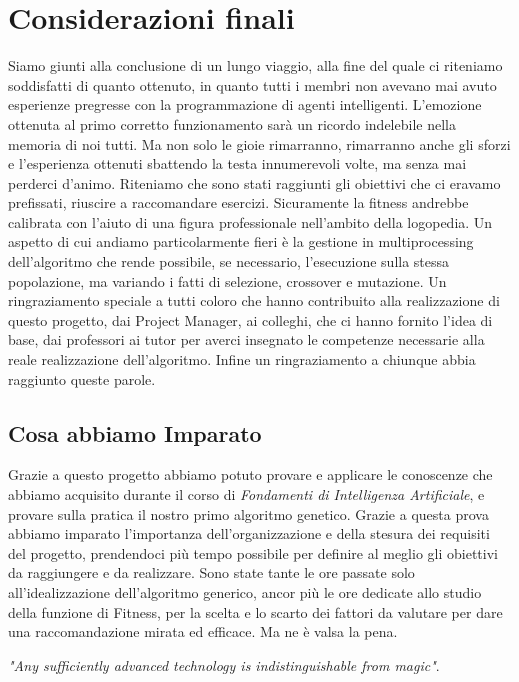 \documentclass{article}
\begin{document}
\section{Considerazioni finali}
Siamo giunti alla conclusione di un lungo viaggio, alla fine del quale ci riteniamo soddisfatti di quanto ottenuto, in quanto tutti i membri non avevano mai avuto esperienze pregresse con la programmazione di agenti intelligenti. L'emozione ottenuta al primo corretto funzionamento sarà un ricordo indelebile nella memoria di noi tutti. Ma non solo le gioie rimarranno, rimarranno anche gli sforzi e l'esperienza ottenuti sbattendo la testa innumerevoli volte, ma senza mai perderci d'animo. Riteniamo che sono stati raggiunti gli obiettivi che ci eravamo prefissati, riuscire a raccomandare esercizi. Sicuramente la fitness andrebbe calibrata con l'aiuto di una figura professionale nell'ambito della logopedia. Un aspetto di cui andiamo particolarmente fieri è la gestione in multiprocessing dell'algoritmo che rende possibile, se necessario, l'esecuzione sulla stessa popolazione, ma variando i fatti di selezione, crossover e mutazione. Un ringraziamento speciale a tutti coloro che hanno contribuito alla realizzazione di questo progetto, dai Project Manager, ai colleghi, che ci hanno fornito l'idea di base, dai professori ai tutor per averci insegnato le competenze necessarie alla reale realizzazione dell'algoritmo. Infine un ringraziamento a chiunque abbia raggiunto queste parole.

\subsection{Cosa abbiamo Imparato}
Grazie a questo progetto abbiamo potuto provare e applicare le conoscenze che abbiamo acquisito durante il corso di \textit{Fondamenti di
Intelligenza Artificiale}, e provare sulla pratica il nostro primo algoritmo genetico. Grazie a questa prova abbiamo imparato l'importanza dell'organizzazione e della stesura dei requisiti del progetto, prendendoci più tempo possibile per definire al meglio gli obiettivi da raggiungere e da realizzare. Sono state tante le ore passate solo all'idealizzazione dell'algoritmo generico, ancor più le ore dedicate allo studio della funzione di Fitness, per la scelta e lo scarto dei fattori da valutare per dare una raccomandazione mirata ed efficace. Ma ne è valsa la pena.
\bigskip

\textit{"Any sufficiently advanced technology is indistinguishable from magic"}.
\pagebreak
\end{document}
